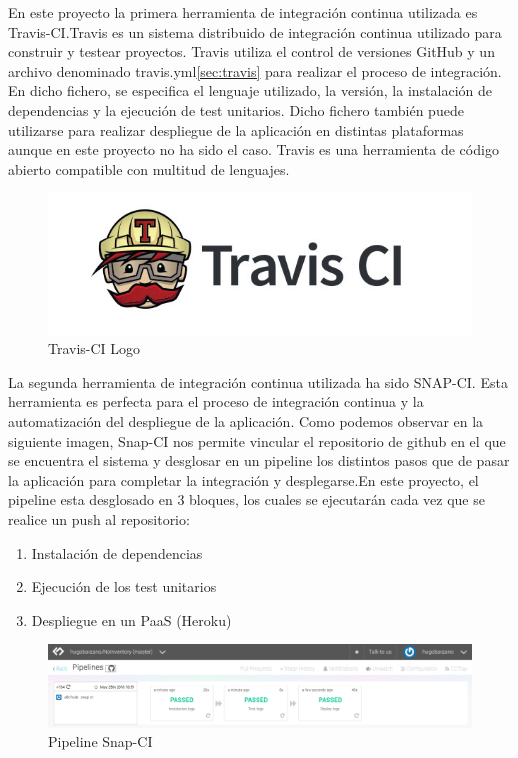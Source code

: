 \documentclass[a4paper,11pt]{book}
\begin{document}
En este proyecto la primera herramienta de integración continua utilizada es Travis-CI\cite{travis}.Travis es un  sistema distribuido de integración continua utilizado para construir y testear proyectos. Travis utiliza el control de versiones GitHub y un archivo denominado travis.yml\ref{sec:travis} para realizar el proceso de integración. En dicho fichero, se especifica el lenguaje utilizado, la versión, la instalación de dependencias y la ejecución de test unitarios. Dicho fichero también puede utilizarse para realizar despliegue de la aplicación en distintas plataformas aunque en este proyecto no ha sido el caso. Travis es una herramienta de código abierto compatible con multitud de lenguajes. 

\begin{figure}[H] 
\centering 
\includegraphics[scale=0.25]{imagenes/desarrollo_herramienta/travis.jpg}
\caption{ Travis-CI Logo\cite{travisL}  }  
\end{figure} 

La segunda herramienta de integración continua utilizada ha sido SNAP-CI\cite{snap}. Esta herramienta es perfecta para el proceso de integración continua y la automatización del despliegue de la aplicación. Como podemos observar en la siguiente imagen, Snap-CI nos permite vincular el repositorio de github en el que se encuentra el sistema y desglosar en un pipeline los distintos pasos que de pasar la aplicación para completar la integración y desplegarse.En este proyecto, el pipeline esta desglosado en 3 bloques, los cuales se ejecutarán cada vez que se realice un push al repositorio:

\begin{enumerate}
\item Instalación de dependencias
\item Ejecución de los test unitarios
\item Despliegue en un PaaS (Heroku)  
\end{enumerate}

\begin{figure}[H] 
\centering 
\includegraphics[scale=0.30]{imagenes/desarrollo_herramienta/snp_ci.png}
\caption{ Pipeline Snap-CI\cite{snapP}  }  
\end{figure}  	
\end{document}
